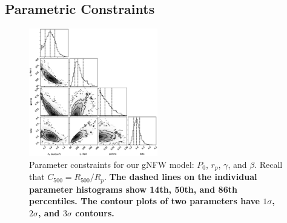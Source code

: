 \documentclass[twocolumn,traditabstract]{aa}
\begin{document}

\subsection{Parametric Constraints}
\label{sec:parametric}

\begin{figure}[!h]
  \centering
  \includegraphics[width=0.5\textwidth]{NIKA_ml_deproj_figs/Real_Joint_gNFW_Real_11011111_2500S_500B_100W_contour_p16cosmo.eps}
  \caption{Parameter constraints for our gNFW model: $P_0$, $r_p$, $\gamma$, and $\beta$. Recall that $C_{500} = R_{500} / R_p$.
    \textbf{The dashed lines on the individual parameter histograms show 14th, 50th, and 86th percentiles. The contour plots of two
    parameters have $1\sigma$, $2\sigma$, and $3\sigma$ contours.}}
  \label{fig:joint_constraints}
\end{figure}
\end{document}
